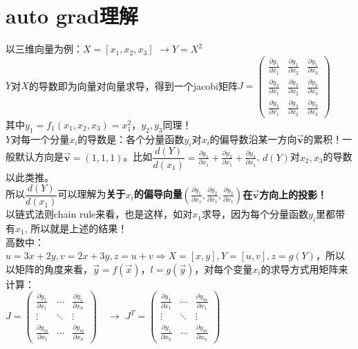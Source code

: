 \documentclass[UTF8]{article}
\begin{document}
    \section{auto grad理解}
    以三维向量为例：$X=\left[x_{1}, x_{2}, x_{3}\right]$ \quad $\rightarrow Y=X^{2}$
    \\
    $Y$对$X$的导数即为向量对向量求导，得到一个jacobi矩阵$J=\left(\begin{array}{lll}{\frac{\partial y_{1}}{\partial x_{1}}} & {\frac{\partial y_{1}}{\partial x_{2}}} & {\frac{\partial y_{1}}{\partial x_{3}}} \\ {\frac{\partial y_{2}}{\partial x_{1}}} & {\frac{\partial y_{2}}{\partial x_{2}}} & {\frac{\partial y_{2}}{\partial x_{3}}} \\ {\frac{\partial y_{3}}{\partial x_{1}}} & {\frac{\partial y_{3}}{\partial x_{2}}} & {\frac{\partial y_{3}}{\partial x_{3}}}\end{array}\right)$
    \\
    其中$y_{1}=f_{1}\left(x_{1}, x_{2}, x_{3}\right)=x_{1}^{2}$，$y_{2}, y_{3}$同理！\\
    $Y$对每一个分量$x_{i}$的导数是：各个分量函数$y_{i}$对$x_{i}$的偏导数沿某一方向$\bm{\vec{v}}$的累积！一般默认方向是$\bm{\vec{v}}=(1,1,1)$。比如$\dfrac{d(Y)}{d(x_{1})}=\frac{\partial y_{1}}{\partial x_{1}}+\frac{\partial y_{2}}{\partial x_{1}}+\frac{\partial y_{3}}{\partial x_{1}}$, $d(Y)$对$x_{2},x_{3}$的导数以此类推。
    \\
    所以$\dfrac{d(Y)}{d(x_{1})}$可以理解为\textbf{关于}$x_{i}$\textbf{的偏导向量}$(\frac{\partial y_{1}}{\partial x_{1}},\frac{\partial y_{2}}{\partial x_{1}},\frac{\partial y_{3}}{\partial x_{1}})$\textbf{在$\bm{\vec{v}}$方向上的投影！}
    \\
    以链式法则chain rule来看，也是这样，如对$x_{1}$求导，因为每个分量函数$y_{i}$里都带有$x_{1}$, 所以就是上述的结果！
    \\
    高数中：$u=3x+2y, v=2x+3y, z=u+v \Rightarrow X=[x,y], Y=[u, v],z=g(Y)$，所以以矩阵的角度来看，$\vec{y}=f(\vec{x})$，$l=g(\vec{y})$，对每个变量$x_{i}$的求导方式用矩阵来计算：
    \\
    $J=\left(\begin{array}{ccc}{\frac{\partial y_{1}}{\partial x_{1}}} & {\cdots} & {\frac{\partial y_{1}}{\partial x_{n}}} \\ {\vdots} & {\ddots} & {\vdots} \\ {\frac{\partial y_{m}}{\partial x_{1}}} & {\cdots} & {\frac{\partial y_{m}}{\partial x_{n}}}\end{array}\right)\quad \rightarrow$ $J^{T} = \left(\begin{array}{ccc}{\frac{\partial y_{1}}{\partial x_{1}}} & {\cdots} & {\frac{\partial y_{m}}{\partial x_{1}}} \\ {\vdots} & {\ddots} & {\vdots} \\ {\frac{\partial y_{1}}{\partial x_{n}}} & {\cdots} & {\frac{\partial y_{m}}{\partial x_{n}}}\end{array}\right)$
\end{document}
